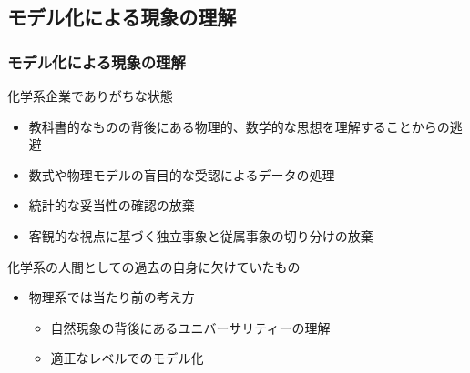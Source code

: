 \documentclass[unicode,12pt]{beamer}%
\begin{document}
\subsection{モデル化による現象の理解}
\begin{frame}
    \frametitle{モデル化による現象の理解}

    \begin{block}{化学系企業でありがちな状態}
        \begin{itemize}
            \item 教科書的なものの背後にある物理的、数学的な思想を理解することからの逃避
            \item 数式や物理モデルの盲目的な受認によるデータの処理
            \item 統計的な妥当性の確認の放棄
            \item 客観的な視点に基づく独立事象と従属事象の切り分けの放棄
        \end{itemize}
    \end{block}

    \begin{alertblock}{化学系の人間としての過去の自身に欠けていたもの}
        \begin{itemize}
            \item 物理系では当たり前の考え方
            \begin{itemize}
                \item 自然現象の背後にあるユニバーサリティーの理解
                \item 適正なレベルでのモデル化
            \end{itemize}
        \end{itemize}
    \end{alertblock}
\end{frame}
\end{document}
